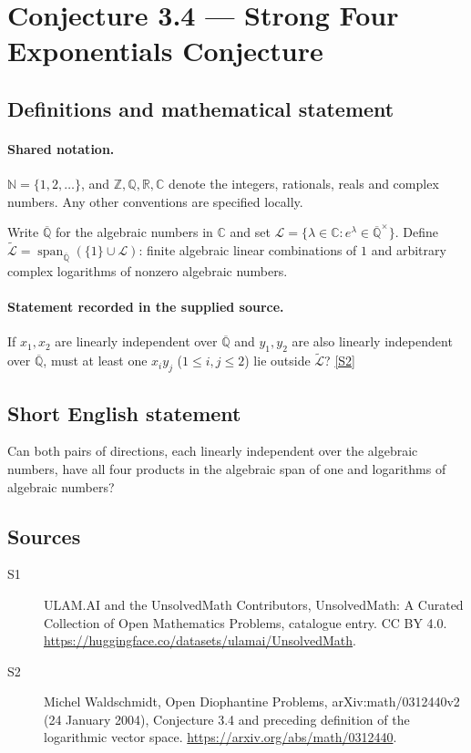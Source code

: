 \documentclass[11pt]{article}
\newcommand{\sref}[2]{\hyperlink{source:#1:#2}{[S#2]}}
\begin{document}
\section{Conjecture 3.4 — Strong Four Exponentials Conjecture}\label{statement}

\subsection{Definitions and mathematical statement}

\paragraph{Shared notation.}$\mathbb N=\{1,2,\ldots\}$, and $\mathbb Z,\mathbb Q,\mathbb R,\mathbb C$ denote the integers, rationals, reals and complex numbers. Any other conventions are specified locally.


Write $\overline{\mathbb Q}$ for the algebraic numbers in $\mathbb C$ and set $\mathcal L=\{\lambda\in\mathbb C:e^\lambda\in\overline{\mathbb Q}^{\times}\}$. Define $\widetilde{\mathcal L}=\operatorname{span}_{\overline{\mathbb Q}}(\{1\}\cup\mathcal L)$: finite algebraic linear combinations of $1$ and arbitrary complex logarithms of nonzero algebraic numbers.
\paragraph{Statement recorded in the supplied source.}
If $x_1,x_2$ are linearly independent over $\overline{\mathbb Q}$ and $y_1,y_2$ are also linearly independent over $\overline{\mathbb Q}$, must at least one $x_i y_j$ ($1\le i,j\le2$) lie outside $\widetilde{\mathcal L}$? \sref{statement}{2}
\subsection{Short English statement}
Can both pairs of directions, each linearly independent over the algebraic numbers, have all four products in the algebraic span of one and logarithms of algebraic numbers?
\subsection{Sources}
\begin{description}
\item[\hypertarget{source:statement:1}{S1}] ULAM.AI and the UnsolvedMath Contributors, UnsolvedMath: A Curated Collection of Open Mathematics Problems, catalogue entry. CC BY 4.0. \url{https://huggingface.co/datasets/ulamai/UnsolvedMath}.
\item[\hypertarget{source:statement:2}{S2}] Michel Waldschmidt, Open Diophantine Problems, arXiv:math/0312440v2 (24 January 2004), Conjecture 3.4 and preceding definition of the logarithmic vector space. \url{https://arxiv.org/abs/math/0312440}.
\end{description}
\label{end:statement}
\end{document}
